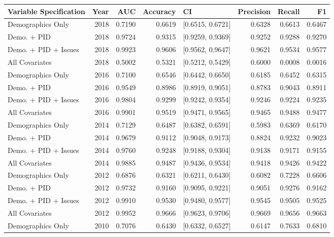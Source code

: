 \begin{table}[H]
\centering
\begin{tabular}{lrrrlrrr}
  \toprule
Variable Specification & Year & AUC & Accuracy & CI & Precision & Recall & F1 \\ 
  \midrule
Demographics Only & 2018 & 0.7190 & 0.6619 & [0.6515, 0.6721] & 0.6328 & 0.6613 & 0.6467 \\ 
  Demo. + PID & 2018 & 0.9724 & 0.9315 & [0.9259, 0.9369] & 0.9252 & 0.9288 & 0.9270 \\ 
  Demo. + PID + Issues & 2018 & 0.9923 & 0.9606 & [0.9562, 0.9647] & 0.9621 & 0.9534 & 0.9577 \\ 
  All Covariates & 2018 & 0.5002 & 0.5321 & [0.5212, 0.5429] & 0.6000 & 0.0008 & 0.0016 \\ 
  Demographics Only & 2016 & 0.7100 & 0.6546 & [0.6442, 0.6650] & 0.6185 & 0.6452 & 0.6315 \\ 
  Demo. + PID & 2016 & 0.9549 & 0.8986 & [0.8919, 0.9051] & 0.8783 & 0.9043 & 0.8911 \\ 
  Demo. + PID + Issues & 2016 & 0.9804 & 0.9299 & [0.9242, 0.9354] & 0.9246 & 0.9224 & 0.9235 \\ 
  All Covariates & 2016 & 0.9901 & 0.9519 & [0.9471, 0.9565] & 0.9465 & 0.9488 & 0.9477 \\ 
  Demographics Only & 2014 & 0.7129 & 0.6487 & [0.6382, 0.6591] & 0.5983 & 0.6369 & 0.6170 \\ 
  Demo. + PID & 2014 & 0.9679 & 0.9112 & [0.9048, 0.9173] & 0.8824 & 0.9232 & 0.9023 \\ 
  Demo. + PID + Issues & 2014 & 0.9760 & 0.9248 & [0.9188, 0.9304] & 0.9138 & 0.9171 & 0.9155 \\ 
  All Covariates & 2014 & 0.9885 & 0.9487 & [0.9436, 0.9534] & 0.9418 & 0.9426 & 0.9422 \\ 
  Demographics Only & 2012 & 0.6876 & 0.6321 & [0.6211, 0.6430] & 0.6082 & 0.7228 & 0.6606 \\ 
  Demo. + PID & 2012 & 0.9732 & 0.9160 & [0.9095, 0.9221] & 0.9051 & 0.9276 & 0.9162 \\ 
  Demo. + PID + Issues & 2012 & 0.9910 & 0.9530 & [0.9480, 0.9577] & 0.9545 & 0.9505 & 0.9525 \\ 
  All Covariates & 2012 & 0.9952 & 0.9666 & [0.9623, 0.9706] & 0.9669 & 0.9656 & 0.9663 \\ 
  Demographics Only & 2010 & 0.7076 & 0.6430 & [0.6332, 0.6527] & 0.6147 & 0.7633 & 0.6810 \\ 

\end{tabular}
\end{table}
